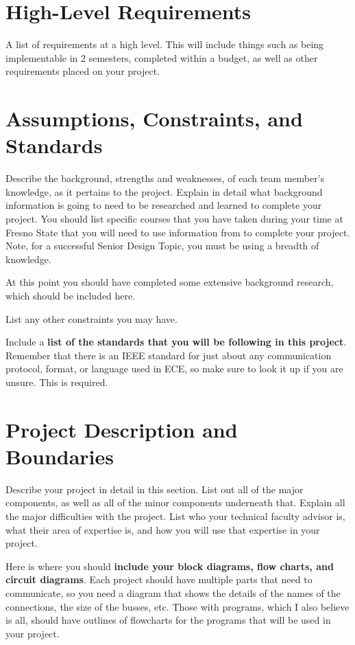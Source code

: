 \documentclass[12pt,onecolumn]{IEEEtran}			%
\begin{document}
 \section{High-Level Requirements}
 A list of requirements at a high level.  This will include things such as being implementable in 2 semesters, completed within a budget, as well
 as other requirements placed on your project.
 
\section{Assumptions, Constraints, and Standards}
Describe the background, strengths and weaknesses, of each
team member's knowledge, as it pertains to the project.  Explain in detail what background information is going to need to be researched
and learned to complete your project.  You should list specific courses that you have taken during your time at Fresno State that you will need to 
use information from to complete your project.  Note, for a successful Senior Design Topic, you must be using a breadth of knowledge.

At this point you should have completed some extensive background research, which should be included here.

List any other constraints you may have.

Include a \textbf{list of the standards that you will be following in this project}.  Remember that there is an
IEEE standard for just about any communication protocol, format, or language used in ECE, so make sure to
look it up if you are unsure.  This is required.
 
\section{Project Description and Boundaries}
Describe your project in detail in this section.  List out all of the major components, as well as all of the minor components underneath that.
Explain all the major difficulties with the project.  
List who your technical faculty advisor is, what their area of expertise is, and how
you will use that expertise in your project.

Here is where you should \textbf{include your block diagrams, flow charts, and circuit diagrams}.
Each project should have multiple parts that need to communicate, so you need a diagram that shows the details
of the names of the connections, the size of the busses, etc.  Those with programs, which I also believe is all,
should have outlines of flowcharts for the programs that will be used in your project.
\end{document}
